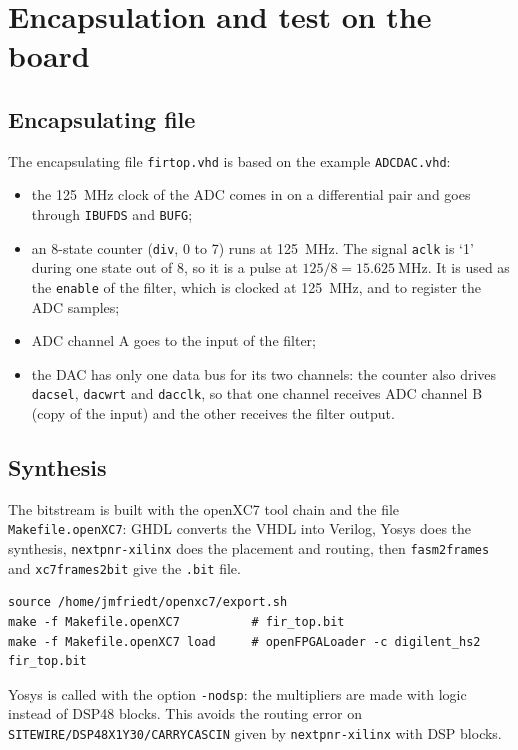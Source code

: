 \documentclass[11pt,a4paper]{article}
\renewcommand{\_}{\oldunderscore\allowbreak}
\begin{document}
\section{Encapsulation and test on the board}

\subsection{Encapsulating file}
The encapsulating file \texttt{fir\_top.vhd} is based on the example
\texttt{ADC\_DAC.vhd}:
\begin{itemize}
  \item the \SI{125}{\mega\hertz} clock of the ADC comes in on a differential
        pair and goes through \texttt{IBUFDS} and \texttt{BUFG};
  \item an 8-state counter (\texttt{div}, 0 to 7) runs at
        \SI{125}{\mega\hertz}. The signal \texttt{aclk} is `1' during one
        state out of 8, so it is a pulse at $125/8 = \SI{15.625}{\mega\hertz}$.
        It is used as the \texttt{enable} of the filter, which is clocked at
        \SI{125}{\mega\hertz}, and to register the ADC samples;
  \item ADC channel A goes to the input of the filter;
  \item the DAC has only one data bus for its two channels: the counter also
        drives \texttt{dac\_sel}, \texttt{dac\_wrt} and \texttt{dac\_clk}, so
        that one channel receives ADC channel B (copy of the input) and the
        other receives the filter output.
\end{itemize}

\subsection{Synthesis}
The bitstream is built with the openXC7 tool chain and the file
\texttt{Makefile.openXC7}: GHDL converts the VHDL into Verilog, Yosys does the
synthesis, \texttt{nextpnr-xilinx} does the placement and routing, then
\texttt{fasm2frames} and \texttt{xc7frames2bit} give the \texttt{.bit} file.
\begin{lstlisting}[style=sh, caption={Synthesis and loading with openXC7}]
source /home/jmfriedt/openxc7/export.sh
make -f Makefile.openXC7          # fir_top.bit
make -f Makefile.openXC7 load     # openFPGALoader -c digilent_hs2 fir_top.bit
\end{lstlisting}
Yosys is called with the option \texttt{-nodsp}: the multipliers are made with
logic instead of DSP48 blocks. This avoids the routing error on
\texttt{SITEWIRE/DSP48\_X1Y30/CARRYCASCIN} given by \texttt{nextpnr-xilinx}
with DSP blocks.
\end{document}
